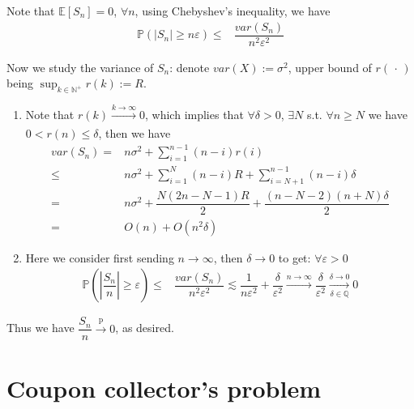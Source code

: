 \documentclass[11pt,a4paper]{article}
\numberwithin{equation}{section}%
\begin{document}
Note that $ \mathbb{E}\left[ S_n \right] =0 $, $ \forall n $, using Chebyshev's inequality, we have
\begin{align*}
    \mathbb{P}\left( \left\vert S_n \right\vert \geq n\varepsilon  \right)  \leq & \dfrac{ var(S_n) }{ n^2\varepsilon ^2 } 
\end{align*}

Now we study the variance of $ S_n $: denote $ var(X):=\sigma ^2 $, upper bound of $ r(\, \cdot \, ) $ being $ \sup_{k\in\mathbb{N^+}} r(k) := R $.
\begin{enumerate}[topsep=2pt,itemsep=0pt]
    \item Note that $ r(k)\xrightarrow[]{k\to \infty} 0 $, which implies that $ \forall \delta >0 $, $ \exists N $ s.t. $ \forall n\geq N $ we have $ 0< r(n)\leq \delta  $, then we have
    \begin{align*}
        var(S_n)=&  n\sigma^2 + \sum_{i=1}^{n-1} (n-i)r(i)\\
        \leq & n\sigma^2 + \sum_{i=1}^{N} (n-i)R + \sum_{i=N+1}^{n-1} (n-i)\delta\\
        =& n\sigma^2 + \dfrac{ N(2n-N-1)R }{ 2 } + \dfrac{ (n-N-2)(n+N)\delta  }{ 2 }\\
        =& O(n) + O(n^2\delta )
    \end{align*}
    \item Here we consider first sending $ n\to\infty $, then $ \delta \to 0 $ to get: $ \forall \varepsilon >0 $
    \begin{align*}
        \mathbb{P}\left( \left\vert \dfrac{ S_n }{ n }  \right\vert \geq \varepsilon  \right) \leq &  \dfrac{ var(S_n) }{ n^2\varepsilon ^2 } 
        \lesssim  \dfrac{ 1 }{ n\varepsilon ^2 } + \dfrac{ \delta  }{ \varepsilon ^2 }
        \xrightarrow[]{n\to\infty} \dfrac{ \delta  }{ \varepsilon ^2 } 
        \xrightarrow[\delta \in \mathbb{Q}]{\delta \to 0}  0 
    \end{align*}

\end{enumerate}

Thus we have $ \dfrac{ S_n }{ n } \xrightarrow[]{\mathrm{p}} 0 $, as desired.

    

\section{Coupon collector's problem}
\end{document}
